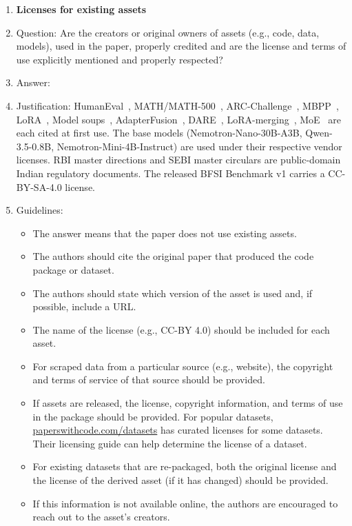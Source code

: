 \begin{enumerate}
\item {\bf Licenses for existing assets}
    \item[] Question: Are the creators or original owners of assets (e.g., code, data, models), used in the paper, properly credited and are the license and terms of use explicitly mentioned and properly respected?
    \item[] Answer: \answerYes{}
    \item[] Justification: HumanEval~\cite{chen2021evaluating}, MATH/MATH-500~\cite{hendrycks2021math}, ARC-Challenge~\cite{clark2018arc}, MBPP~\cite{austin2021mbpp}, LoRA~\cite{hu2021lora}, Model soups~\cite{wortsman2022model}, AdapterFusion~\cite{pfeiffer2020adapterfusion}, DARE~\cite{edalati2023absorbing}, LoRA-merging~\cite{quarantiello2024adaptive}, MoE~\cite{shazeer2017moe,fedus2021switch} are each cited at first use. The base models (Nemotron-Nano-30B-A3B, Qwen-3.5-0.8B, Nemotron-Mini-4B-Instruct) are used under their respective vendor licenses. RBI master directions and SEBI master circulars are public-domain Indian regulatory documents. The released BFSI Benchmark v1 carries a CC-BY-SA-4.0 license.
    \item[] Guidelines:
    \begin{itemize}
        \item The answer \answerNA{} means that the paper does not use existing assets.
        \item The authors should cite the original paper that produced the code package or dataset.
        \item The authors should state which version of the asset is used and, if possible, include a URL.
        \item The name of the license (e.g., CC-BY 4.0) should be included for each asset.
        \item For scraped data from a particular source (e.g., website), the copyright and terms of service of that source should be provided.
        \item If assets are released, the license, copyright information, and terms of use in the package should be provided. For popular datasets, \url{paperswithcode.com/datasets} has curated licenses for some datasets. Their licensing guide can help determine the license of a dataset.
        \item For existing datasets that are re-packaged, both the original license and the license of the derived asset (if it has changed) should be provided.
        \item If this information is not available online, the authors are encouraged to reach out to the asset's creators.
    \end{itemize}


\end{enumerate}
